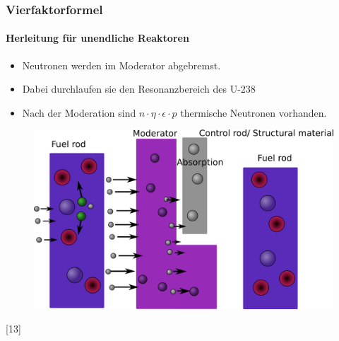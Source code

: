 \documentclass{beamer}[9pt]
\begin{document}
\begin{frame}
\frametitle{Vierfaktorformel}
\framesubtitle{Herleitung für unendliche Reaktoren}
\begin{itemize}
\item Neutronen werden im Moderator abgebremst.
\item Dabei durchlaufen sie den Resonanzbereich des U-238
\item Nach der Moderation sind $n\cdot\eta\cdot\epsilon\cdot p $  thermische
 Neutronen vorhanden.\\
\end{itemize}

\begin{figure}
\centering
\includegraphics[scale=.15]{thermal_reactor_3.png}
\end{figure}
\hspace{.5\textwidth}[13]
\end{frame}
\end{document}

